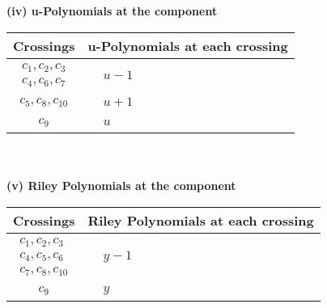 \documentclass[1p]{elsarticle_modified}
\theoremstyle{definition}
\begin{document}
\flushleft \textbf{(iv) u-Polynomials at the component}\newline \\
\begin{tabular}{m{50pt}|m{274pt}}
Crossings & \hspace{64pt}u-Polynomials at each crossing \\
\hline $$\begin{aligned}c_{1},c_{2},c_{3}\\c_{4},c_{6},c_{7}\end{aligned}$$&$\begin{aligned}
&u-1
\end{aligned}$\\
\hline $$\begin{aligned}c_{5},c_{8},c_{10}\end{aligned}$$&$\begin{aligned}
&u+1
\end{aligned}$\\
\hline $$\begin{aligned}c_{9}\end{aligned}$$&$\begin{aligned}
&u
\end{aligned}$\\
\hline
\end{tabular}\\~\\
\newpage\renewcommand{\arraystretch}{1}
\flushleft \textbf{(v) Riley Polynomials at the component}\newline \\
\begin{tabular}{m{50pt}|m{274pt}}
Crossings & \hspace{64pt}Riley Polynomials at each crossing \\
\hline $$\begin{aligned}c_{1},c_{2},c_{3}\\c_{4},c_{5},c_{6}\\c_{7},c_{8},c_{10}\end{aligned}$$&$\begin{aligned}
&y-1
\end{aligned}$\\
\hline $$\begin{aligned}c_{9}\end{aligned}$$&$\begin{aligned}
&y
\end{aligned}$\\
\hline
\end{tabular}\\~\\
\end{document}
